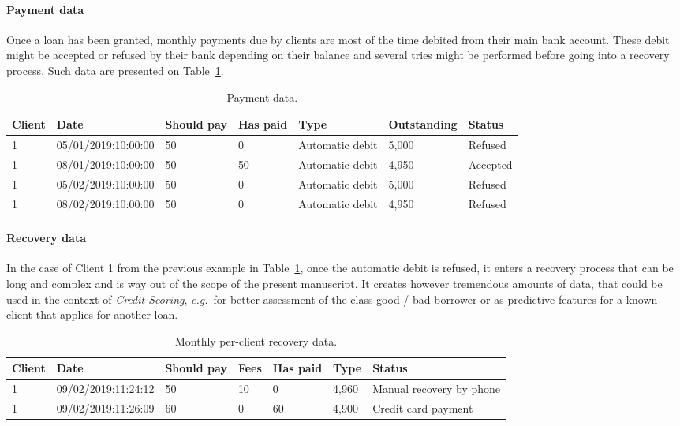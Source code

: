 \paragraph{Payment data}

Once a loan has been granted, monthly payments due by clients are most of the time debited from their main bank account. These debit might be accepted or refused by their bank depending on their balance and several tries might be performed before going into a recovery process. Such data are presented on Table~\ref{tab:payment_data}.

\begin{table}[ht]
    \centering
    \caption{Payment data.}
    \label{tab:payment_data}
    \begin{small}
\begin{tabular}{lllllll}
Client & Date & Should pay & Has paid & Type & Outstanding & Status \\
 \hline
1 & 05/01/2019:10:00:00 & 50 & 0 & Automatic debit & 5{,}000 & Refused \\
1 & 08/01/2019:10:00:00 & 50 & 50 & Automatic debit & 4{,}950 & Accepted \\
1 & 05/02/2019:10:00:00 & 50 & 0 & Automatic debit & 5{,}000 & Refused \\
1 & 08/02/2019:10:00:00 & 50 & 0 & Automatic debit & 4{,}950 & Refused
\end{tabular}
    \end{small}
\end{table}


\paragraph{Recovery data}

In the case of Client 1 from the previous example in Table~\ref{tab:payment_data}, once the automatic debit is refused, it enters a recovery process that can be long and complex and is way out of the scope of the present manuscript. It creates however tremendous amounts of data, that could be used in the context of \textit{Credit Scoring}, \textit{e.g.}\ for better assessment of the class good / bad borrower or as predictive features for a known client that applies for another loan.

\begin{table}[ht]
    \centering
    \caption{Monthly per-client recovery data.}
    \label{tab:recovery_data}
    \begin{small}
\begin{tabular}{lllllll}
Client & Date & Should pay & Fees & Has paid & Type & Status \\
 \hline
1 & 09/02/2019:11:24:12 & 50 & 10 & 0 & 4{,}960 & Manual recovery by phone \\
1 & 09/02/2019:11:26:09 & 60 & 0 & 60 & 4{,}900 & Credit card payment \\
\end{tabular}
    \end{small}
\end{table}

